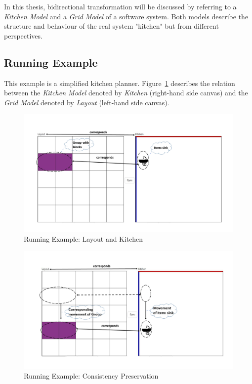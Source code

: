 In this thesis, bidirectional transformation will be discussed by referring to a \textit{Kitchen Model} and a \textit{Grid Model} of a software system. Both models describe the structure and behaviour of the real system "kitchen" but from different perspectives.

\subsection{Running Example}\label{subsec:runningexample}
This example is a simplified kitchen planner. Figure~\ref{fig:Running_Example_GUI} describes the relation between the \textit{Kitchen Model} denoted by \textit{Kitchen} (right-hand side canvas) and the \textit{Grid Model} denoted by \textit{Layout} (left-hand side canvas). 

\begin{figure}
	\includegraphics[width=1\textwidth]{figures/KitchenToGrid}
	\caption{Running Example: Layout and Kitchen}
	\label{fig:Running_Example_GUI}
\end{figure} 

\begin{figure}
	\includegraphics[width=1\textwidth]{figures/KitchenToGrid_consistency}
	\caption{Running Example: Consistency Preservation}
	\label{fig:Running_Example_GUI_consistency}
\end{figure}

